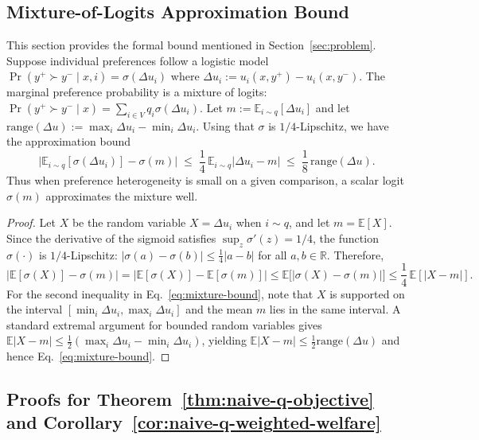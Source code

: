 \documentclass{article}
\theoremstyle{plain}
\theoremstyle{definition}
\theoremstyle{remark}
\begin{document}
\subsection{Mixture-of-Logits Approximation Bound}
\label{app:proof-mixture}

This section provides the formal bound mentioned in Section~\ref{sec:problem}. Suppose individual preferences follow a logistic model
$\Pr(y^+ \succ y^- \mid x,i)=\sigma(\Delta u_i)$ where 
$\Delta u_i := u_i(x,y^+) - u_i(x,y^-)$.
The marginal preference probability is a mixture of logits:
$\Pr(y^+ \succ y^- \mid x)=\sum_{i \in V} q_i \sigma(\Delta u_i)$.
Let $m := \mathbb{E}_{i\sim q}[\Delta u_i]$ and let 
$\mathrm{range}(\Delta u):=\max_i \Delta u_i-\min_i \Delta u_i$.
Using that $\sigma$ is $1/4$-Lipschitz, we have the approximation bound
\begin{equation}
\Big|
\mathbb{E}_{i\sim q}[\sigma(\Delta u_i)]-\sigma(m)
\Big|
\;\le\;
\frac{1}{4}\,\mathbb{E}_{i\sim q}\big|\Delta u_i-m\big|
\;\le\;
\frac{1}{8}\,\mathrm{range}(\Delta u).
\label{eq:mixture-bound}
\end{equation}
Thus when preference heterogeneity is small on a given comparison, a scalar
logit $\sigma(m)$ approximates the mixture well.

\begin{proof}
Let $X$ be the random variable $X=\Delta u_i$ when $i\sim q$, and let
$m=\mathbb{E}[X]$. Since the derivative of the sigmoid satisfies
$\sup_z \sigma'(z)=1/4$, the function $\sigma(\cdot)$ is $1/4$-Lipschitz:
$|\sigma(a)-\sigma(b)|\le \frac{1}{4}|a-b|$ for all $a,b\in\mathbb{R}$.
Therefore,
\[
\Big|\mathbb{E}[\sigma(X)]-\sigma(m)\Big|
=
\Big|\mathbb{E}[\sigma(X)]-\mathbb{E}[\sigma(m)]\Big|
\le 
\mathbb{E}\big[|\sigma(X)-\sigma(m)|\big]
\le
\frac{1}{4}\,\mathbb{E}[|X-m|].
\]
For the second inequality in Eq.~\eqref{eq:mixture-bound}, note that $X$ is
supported on the interval $[\min_i \Delta u_i,\max_i \Delta u_i]$ and the mean
$m$ lies in the same interval. A standard extremal argument for bounded random
variables gives $\mathbb{E}|X-m|\le \frac{1}{2}(\max_i \Delta u_i-\min_i \Delta u_i)$,
yielding $\mathbb{E}|X-m|\le \frac{1}{2}\mathrm{range}(\Delta u)$ and hence
Eq.~\eqref{eq:mixture-bound}.
\end{proof}

\subsection{Proofs for Theorem~\ref{thm:naive-q-objective} and Corollary~\ref{cor:naive-q-weighted-welfare}}
\label{app:proof-naive-split}
\end{document}

